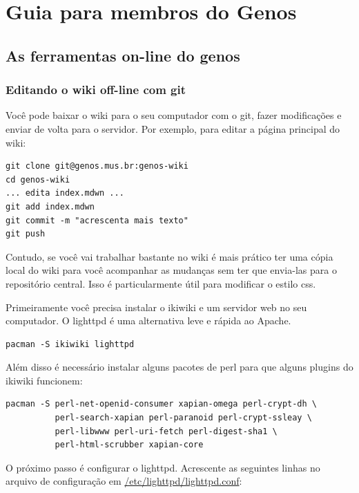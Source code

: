 \documentclass[12pt,brazil]{book}
\begin{document}
\part{Guia para membros do Genos}
\label{part:guia-para-membros}

\chapter{As ferramentas on-line do genos}
\label{cha:ferramentas-genos}

\section{Editando o wiki off-line com git}
\label{sec:editando-o-wiki}

Você pode baixar o wiki para o seu computador com o git, fazer
modificações e enviar de volta para o servidor. Por exemplo, para
editar a página principal do wiki:

\begin{verbatim}
git clone git@genos.mus.br:genos-wiki
cd genos-wiki
... edita index.mdwn ...
git add index.mdwn
git commit -m "acrescenta mais texto"
git push
\end{verbatim}

Contudo, se você vai trabalhar bastante no wiki é mais prático ter uma
cópia local do wiki para você acompanhar as mudanças sem ter que
envia-las para o repositório central. Isso é particularmente útil para
modificar o estilo css.

Primeiramente você precisa instalar o ikiwiki e um servidor web no seu
computador. O lighttpd é uma alternativa leve e rápida ao Apache.

\begin{verbatim}
pacman -S ikiwiki lighttpd
\end{verbatim}

Além disso é necessário instalar alguns pacotes de perl para que
alguns plugins do ikiwiki funcionem:

\begin{verbatim}
pacman -S perl-net-openid-consumer xapian-omega perl-crypt-dh \
          perl-search-xapian perl-paranoid perl-crypt-ssleay \
          perl-libwww perl-uri-fetch perl-digest-sha1 \
          perl-html-scrubber xapian-core 
\end{verbatim}

O próximo passo é configurar o lighttpd. Acrescente as seguintes
linhas no arquivo de configuração em
\url{/etc/lighttpd/lighttpd.conf}:
\end{document}
